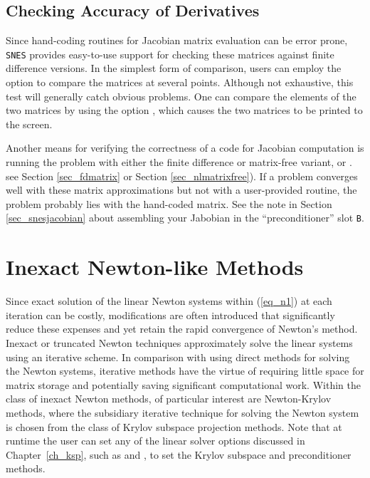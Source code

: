 \subsection{Checking Accuracy of Derivatives}
\label{sec_snesderivs}

Since hand-coding routines for Jacobian matrix evaluation
can be error prone, \lstinline{SNES} provides easy-to-use support for checking
these matrices against finite difference versions.  In the simplest
form of comparison, users can employ the option  
to compare the matrices at several points.  Although not exhaustive,
this test will generally catch obvious problems.  One can compare the
elements of the two matrices by using the option  , which causes the two
matrices to be printed to the screen.  

Another means for verifying the correctness of a code for Jacobian
computation is running the problem with either the finite
difference or matrix-free variant,  or .
see Section \ref{sec_fdmatrix} or Section \ref{sec_nlmatrixfree}).
If a problem converges well
with these matrix approximations but not with a user-provided routine,
the problem probably lies with the hand-coded
matrix. 
See the note in Section \ref{sec_snesjacobian} about assembling your Jabobian
in the ``preconditioner'' slot \lstinline{B}.

\section{Inexact Newton-like Methods}

Since exact solution of the linear Newton systems within (\ref{eq_n1})
at each iteration can be costly, modifications
are often introduced that significantly reduce these expenses and
yet retain the rapid convergence of Newton's method.  Inexact or
truncated Newton techniques approximately solve the linear systems
using an iterative scheme.  In comparison with using direct methods
for solving the Newton systems, iterative methods have the virtue
of requiring little space for matrix storage and potentially saving
significant computational work.  Within the class of inexact Newton
methods, of particular interest are Newton-Krylov methods, where the
subsidiary iterative technique for solving the Newton system is
chosen from the class of Krylov subspace projection methods.
Note that at runtime the user can set any of the linear solver
options discussed in Chapter~\ref{ch_ksp}, such as
 and ,
to set the Krylov subspace and preconditioner methods.

